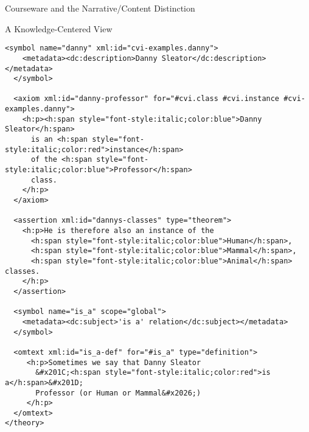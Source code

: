 \begin{omgroup}[id=courseware]{Courseware and the Narrative/Content Distinction}
\begin{omgroup}[id=courseware.knowledge-centered]{A Knowledge-Centered View}
\begin{lstlisting}[label=lst:ann-cvi-ex,
    caption={The {\omdoc} Representation for Slide 3 from {\myfigref{15-211}}},
    index={theory,imports,axiom,symbol,assertion,definition,h:p}]
  <symbol name="danny" xml:id="cvi-examples.danny">
    <metadata><dc:description>Danny Sleator</dc:description></metadata>
  </symbol>

  <axiom xml:id="danny-professor" for="#cvi.class #cvi.instance #cvi-examples.danny">
    <h:p><h:span style="font-style:italic;color:blue">Danny Sleator</h:span>
      is an <h:span style="font-style:italic;color:red">instance</h:span> 
      of the <h:span style="font-style:italic;color:blue">Professor</h:span> 
      class.
    </h:p>
  </axiom>

  <assertion xml:id="dannys-classes" type="theorem">
    <h:p>He is therefore also an instance of the 
      <h:span style="font-style:italic;color:blue">Human</h:span>, 
      <h:span style="font-style:italic;color:blue">Mammal</h:span>, 
      <h:span style="font-style:italic;color:blue">Animal</h:span> classes.
    </h:p>
  </assertion>

  <symbol name="is_a" scope="global">
    <metadata><dc:subject>'is a' relation</dc:subject></metadata>
  </symbol>

  <omtext xml:id="is_a-def" for="#is_a" type="definition">
     <h:p>Sometimes we say that Danny Sleator 
       &#x201C;<h:span style="font-style:italic;color:red">is a</h:span>&#x201D; 
       Professor (or Human or Mammal&#x2026;)
     </h:p>
  </omtext>
</theory>
\end{lstlisting}


\end{omgroup}
\end{omgroup}
